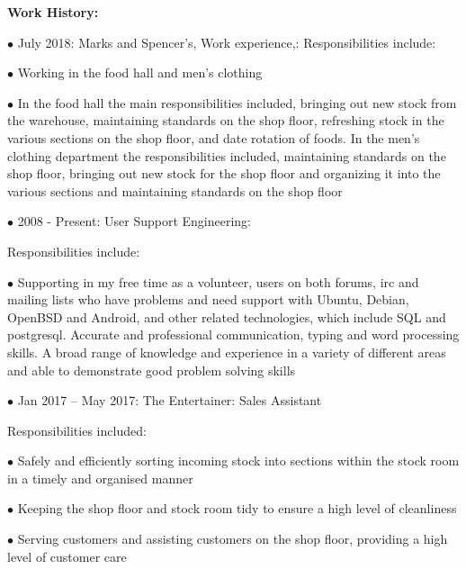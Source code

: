 \documentclass[10pt,a4paper]{book}
\begin{document}
\begin{flushleft}
\textbf {Work History:}

\item[$\bullet$] July 2018: Marks and Spencer's, Work experience,:
  \linebreak{}
Responsibilities include:

  \item[$\bullet$] Working in the food hall and men's clothing

  \item[$\bullet$] In the food hall the main responsibilities included, bringing out new stock from the warehouse, maintaining standards on the shop floor, refreshing stock in the various sections on the shop floor, and date rotation of foods. In the men's clothing department the responsibilities included, maintaining standards on the shop floor, bringing out new stock for the shop floor and organizing it into the various sections and maintaining standards on the shop floor
\linebreak{}
  \item[$\bullet$] 2008 - Present: User Support Engineering: 

Responsibilities include:

  \item[$\bullet$]Supporting in my free time as a volunteer, users on both forums, irc and mailing lists who have problems and need support with Ubuntu, Debian, OpenBSD and Android, and other related technologies, which include SQL and postgresql. Accurate and professional communication, typing and word processing skills. A broad range of knowledge and experience in a variety of different areas and able to demonstrate good problem solving skills
\linebreak{}
\item[$\bullet$]Jan 2017 -- May 2017: The Entertainer: Sales Assistant
  
Responsibilities included:

  \item[$\bullet$]Safely and efficiently sorting incoming stock into sections within the stock room in a timely and organised manner

  \item[$\bullet$]Keeping the shop floor and stock room tidy to ensure a high level of cleanliness

  \item[$\bullet$]Serving customers and assisting customers on the shop floor, providing a high level of customer care


\end{flushleft}
\end{document}
